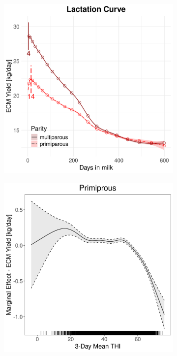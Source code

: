 \begin{figure}[H]
\begin{subfigure}[b]{0.45\textwidth}
        \includegraphics[width=\textwidth]{thesis/figures/models/ecm/full/ob_ecm_full/ob_ecm_full_marginal_dim_milk_combined.png}
    \end{subfigure}
    \begin{subfigure}[b]{0.45\textwidth}
        \centering
        \includegraphics[width=\textwidth]{thesis/figures/models/ecm/full/ob_ecm_full/ob_ecm_full_marginal_thi_milk_primi.png}

\end{subfigure}
\end{figure}
